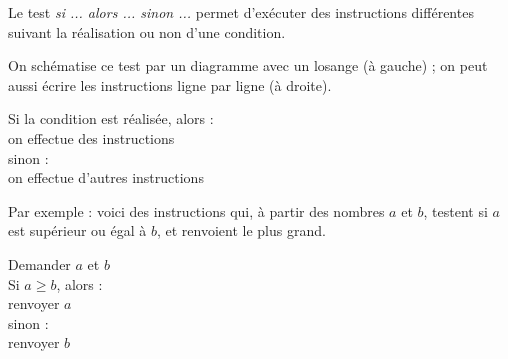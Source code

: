 \documentclass[class=report,crop=false, 12pt]{standalone}
\begin{document}

Le test \emph{si ... alors ... sinon ...} permet d’exécuter des instructions différentes suivant la réalisation ou non d'une condition.

On schématise ce test par un diagramme avec un losange (à gauche) ; on peut aussi écrire les instructions ligne par ligne (à droite).

\begin{center}
\begin{minipage}{0.45\textwidth} 
\footnotesize{}
\end{minipage}
\qquad
\qquad
\begin{minipage}{0.4\textwidth}
Si la condition est réalisée, alors :\\
\indentation on effectue des instructions \\
sinon :\\
\indentation on effectue d'autres instructions \\
\end{minipage}
\end{center}

Par exemple : voici des instructions qui, à partir des nombres $a$ et $b$, testent si $a$ est supérieur ou égal à $b$, et renvoient le plus grand. 

\begin{center}
\begin{minipage}{0.45\textwidth} 
\footnotesize{}
\end{minipage}
\qquad
\qquad
\begin{minipage}{0.4\textwidth}
Demander $a$ et $b$ \\
Si $a \ge b$, alors :\\
\indentation renvoyer $a$ \\
sinon :\\
\indentation renvoyer $b$ \\
\end{minipage}
\end{center}
\end{document}
